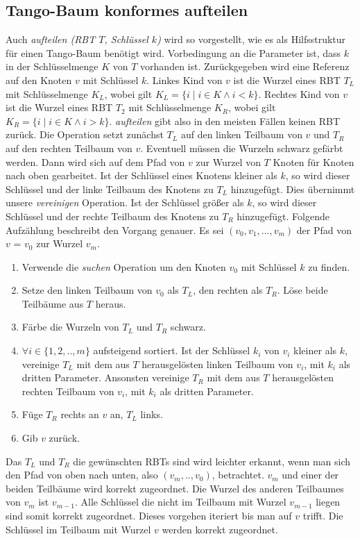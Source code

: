 \documentclass[a4paper,12pt]{article}
\begin{document}
\subsection{Tango-Baum konformes aufteilen}
Auch \textit{aufteilen (RBT $T$, Schlüssel $k$)} wird so vorgestellt, wie es als Hilfsstruktur für einen Tango-Baum benötigt wird. Vorbedingung an die Parameter ist, dass $k$ in der Schlüsselmenge $K$ von $T$ vorhanden ist. Zurückgegeben wird eine Referenz auf den Knoten $v$ mit Schlüssel $k$. Linkes Kind von $v$ ist die Wurzel eines RBT $T_L$ mit Schlüsselmenge $K_L$, wobei gilt ${K_L=\{i \mid  i\in K \land i <k\}}$. Rechtes Kind von $v$ ist die Wurzel eines RBT $T_2$ mit Schlüsselmenge $K_R$, wobei gilt ${K_R = \{i \mid i\in K \land i > k\}}$. \textit{aufteilen} gibt also in den meisten Fällen keinen RBT zurück. Die Operation setzt zunächst $T_L$ auf den linken Teilbaum von $v$ und $T_R$ auf den rechten Teilbaum von $v$. Eventuell müssen die Wurzeln schwarz gefärbt werden. Dann wird sich auf dem Pfad von $v$ zur Wurzel von $T$ Knoten für Knoten nach oben gearbeitet. Ist der Schlüssel eines Knotens kleiner als $k$, so wird dieser Schlüssel und der linke Teilbaum des Knotens zu $T_L$ hinzugefügt. Dies übernimmt unsere \textit{vereinigen} Operation. Ist der Schlüssel größer als $k$, so wird dieser Schlüssel und der rechte Teilbaum des Knotens zu $T_R$ hinzugefügt. Folgende Aufzählung beschreibt den Vorgang genauer.
Es sei $(v_0, v_1,...,v_m) $ der Pfad von $v$ = $v_0$ zur Wurzel $v_m$.
\begin{enumerate}
	\item Verwende die \textit{suchen} Operation um den Knoten $v_0$ mit Schlüssel $k$ zu finden.
	\item Setze den linken Teilbaum von $v_0$ als $T_L$, den rechten als $T_R$. Löse beide Teilbäume aus $T$ heraus.
	\item Färbe die Wurzeln von $T_L$ und $T_R$ schwarz.
	\item $\forall i \in \{1,2,..,m\}$ aufsteigend sortiert. Ist der Schlüssel $k_i$ von $v_i$ kleiner als $k$, vereinige $T_L$ mit dem aus $T$ herausgelösten linken Teilbaum von $v_i$, mit  $k_i$ als dritten Parameter. Ansonsten vereinige $T_R$ mit dem aus $T$ herausgelösten rechten Teilbaum von $v_i$, mit  $k_i$ als dritten Parameter. 
	\item Füge $T_R$ rechts an $v$ an, $T_L$ links.
	\item Gib $v$ zurück.
\end{enumerate}   
Das $T_L$ und $T_R$ die gewünschten RBTs sind wird leichter erkannt, wenn man sich den Pfad von oben nach unten, also $(v_m,..,v_0)$, betrachtet. $v_m$ und einer der beiden Teilbäume wird korrekt zugeordnet. Die Wurzel des anderen Teilbaumes von $v_m$ ist $v_{m-1}$. Alle Schlüssel die nicht im Teilbaum mit Wurzel $v_{m-1}$ liegen sind somit korrekt zugeordnet. Dieses vorgehen iteriert bis man auf $v$ trifft. Die Schlüssel im Teilbaum mit Wurzel $v$ werden korrekt zugeordnet.     
\end{document}
